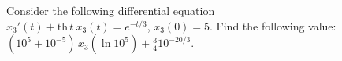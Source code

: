 \begin{figure}[t]
\centering
\setlength{\columnsep}{12pt}
\setlength{\colw}{\dimexpr(\linewidth-2\columnsep)/3\relax}

\begin{promptrow}
\caret{}\par\vspace{4pt}
Consider the following differential equation
$x_{3}'(t) + \mathrm{th}\,t\ x_{3}(t) = e^{-t/3}$, $x_{3}(0) = 5$.
Find the following value:
$(10^{5} + 10^{-5})\,x_{3}(\ln 10^{5}) + \tfrac{3}{4}10^{-20/3}$.
\par\vspace{6pt}
{}\par\vspace{3pt}
{\monofont\footnotesize {}}
\end{promptrow}

\vspace{12pt}


\end{figure}
